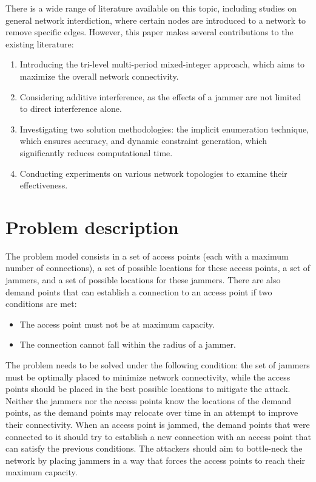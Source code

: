 \documentclass[runningheads]{llncs}
\begin{document}
There is a wide range of literature available on this topic, including studies on general network interdiction, where certain nodes are introduced to a network to remove specific edges. However, this paper makes several contributions to the existing literature:
\begin{enumerate}
    \item Introducing the tri-level multi-period mixed-integer approach, which aims to maximize the overall network connectivity.
    \item Considering additive interference, as the effects of a jammer are not limited to direct interference alone.
    \item Investigating two solution methodologies: the implicit enumeration technique, which ensures accuracy, and dynamic constraint generation, which significantly reduces computational time.
    \item Conducting experiments on various network topologies to examine their effectiveness.
\end{enumerate}

\section{Problem description}

The problem model consists in a set of access points (each with a maximum number of connections), a set of possible locations for these access points, a set of jammers, and a set of possible locations for these jammers.
There are also demand points that can establish a connection to an access point if two conditions are met:

\begin{itemize}
    \item The access point must not be at maximum capacity.
    \item The connection cannot fall within the radius of a jammer.
\end{itemize}

The problem needs to be solved under the following condition: the set of jammers must be optimally placed to minimize network connectivity, while the access points should be placed in the best possible locations to mitigate the attack. Neither the jammers nor the access points know the locations of the demand points, as the demand points may relocate over time in an attempt to improve their connectivity.
When an access point is jammed, the demand points that were connected to it should try to establish a new connection with an access point that can satisfy the previous conditions. The attackers should aim to bottle-neck the network by placing jammers in a way that forces the access points to reach their maximum capacity.
\end{document}
